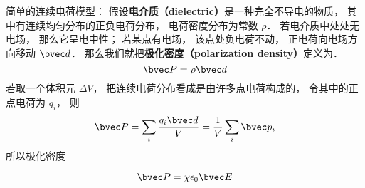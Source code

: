 

简单的连续电荷模型： 假设\textbf{电介质（dielectric）}是一种完全不导电的物质， 其中有连续均匀分布的正负电荷分布， 电荷密度分布为常数 $\rho$． 若电介质中处处无电场， 那么它呈电中性； 若某点有电场， 该点处负电荷不动， 正电荷向电场方向移动 $\bvec d$． 那么我们就把\textbf{极化密度（polarization density）}定义为．
\begin{equation}
\bvec P = \rho \bvec d
\end{equation}
若取一个体积元 $\Delta V$， 把连续电荷分布看成是由许多点电荷构成的， 令其中的正点电荷为 $q_i$， 则
\begin{equation}
\bvec P = \sum_i \frac{q_i\bvec d}{V} = \frac{1}{V} \sum_i \bvec p_i
\end{equation}
所以极化密度

\begin{equation}
\bvec P = \chi \epsilon_0 \bvec E
\end{equation}
